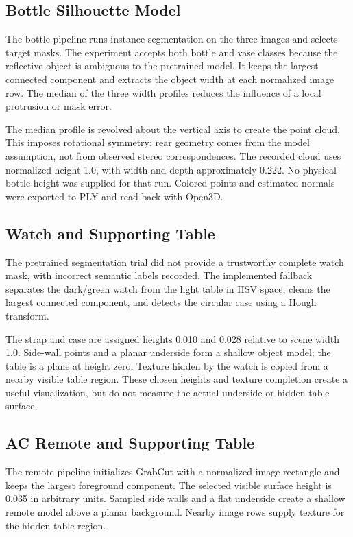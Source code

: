 \subsection{Bottle Silhouette Model}
The bottle pipeline runs instance segmentation on the three images and selects target masks. The experiment accepts both bottle and vase classes because the reflective object is ambiguous to the pretrained model. It keeps the largest connected component and extracts the object width at each normalized image row. The median of the three width profiles reduces the influence of a local protrusion or mask error.

The median profile is revolved about the vertical axis to create the point cloud. This imposes rotational symmetry: rear geometry comes from the model assumption, not from observed stereo correspondences. The recorded cloud uses normalized height 1.0, with width and depth approximately 0.222. No physical bottle height was supplied for that run. Colored points and estimated normals were exported to PLY and read back with Open3D.

\subsection{Watch and Supporting Table}
The pretrained segmentation trial did not provide a trustworthy complete watch mask, with incorrect semantic labels recorded. The implemented fallback separates the dark/green watch from the light table in HSV space, cleans the largest connected component, and detects the circular case using a Hough transform.

The strap and case are assigned heights 0.010 and 0.028 relative to scene width 1.0. Side-wall points and a planar underside form a shallow object model; the table is a plane at height zero. Texture hidden by the watch is copied from a nearby visible table region. These chosen heights and texture completion create a useful visualization, but do not measure the actual underside or hidden table surface.

\subsection{AC Remote and Supporting Table}
The remote pipeline initializes GrabCut with a normalized image rectangle and keeps the largest foreground component. The selected visible surface height is 0.035 in arbitrary units. Sampled side walls and a flat underside create a shallow remote model above a planar background. Nearby image rows supply texture for the hidden table region.

